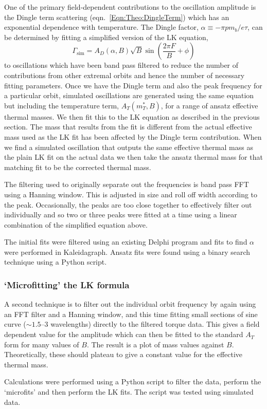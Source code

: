 One of the primary field-dependent contributions to the oscillation amplitude is the Dingle term scattering (eqn.~\ref{Eqn:Theo:DingleTerm}) which has an exponential dependence with temperature. The Dingle factor, $\alpha \equiv -\pi p m_b/e\tau$, can be determined by fitting a simplified version of the \ac{LK} equation,
\begin{equation}
    \Gamma_{\textrm{sim}} =  A_D(\alpha, B) \sqrt{B} \sin{\left(\frac{2\pi F}{B} + \phi \right)}
\end{equation}
 to oscillations which have been band pass filtered to reduce the number of contributions from other extremal orbits and hence the number of necessary fitting parameters. Once we have the Dingle term and also the peak frequency for a particular orbit, simulated oscillations are generated using the same equation but including the temperature term, $A_T(m^*_T, B)$, for a range of ansatz effective thermal masses. We then fit this to the \ac{LK} equation as described in the previous section. The mass that results from the fit is different from the actual effective mass used as the \ac{LK} fit has been affected by the Dingle term contribution. When we find a simulated oscillation that outputs the same effective thermal mass as the plain \ac{LK} fit on the actual data we then take the ansatz thermal mass for that matching fit to be the corrected thermal mass.

The filtering used to originally separate out the frequencies is band pass \ac{FFT} using a Hanning window.  This is adjusted in size and roll off width according to the peak. Occasionally, the peaks are too close together to effectively filter out individually and so two or three peaks were fitted at a time using a linear combination of the simplified equation above.

The initial fits were filtered using an existing Delphi program and fits to find $\alpha$ were performed in Kaleidagraph. Ansatz fits were found using a binary search technique using a Python script.


\subsubsection{`Microfitting' the \ac{LK} formula}
\label{Sec:Exp:LKMicrofitting}

A second technique is to filter out the individual orbit frequency by again using an \ac{FFT} filter and a Hanning window, and this time fitting small sections of sine curve ($\sim 1.5$--$3$ wavelengths) directly to the filtered torque data. This gives a field dependent value for the amplitude which can then be fitted to the standard $A_T$ form for many values of $B$. The result is a plot of mass values against $B$. Theoretically, these should plateau to give a constant value for the effective thermal mass.

Calculations were performed using a Python script to filter the data, perform the `microfits' and then perform the \ac{LK} fits. The script was tested using simulated data.


